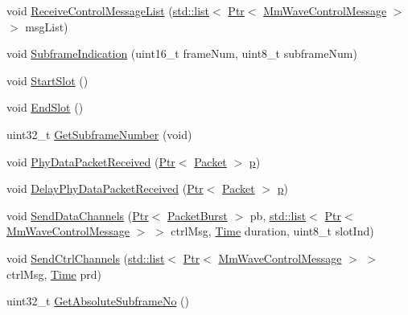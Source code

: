 \begin{DoxyCompactItemize}
void \hyperlink{classns3_1_1MmWaveUePhy_a1c3001d74628f40e38c1b4a04eac5015}{Receive\+Control\+Message\+List} (\hyperlink{openflow-interface_8h_afd9bcfa176617760671b67580f536fa7}{std\+::list}$<$ \hyperlink{classns3_1_1Ptr}{Ptr}$<$ \hyperlink{classns3_1_1MmWaveControlMessage}{Mm\+Wave\+Control\+Message} $>$ $>$ msg\+List)
\item 
void \hyperlink{classns3_1_1MmWaveUePhy_acefe97bdfce414651ec98e37b62d6705}{Subframe\+Indication} (uint16\+\_\+t frame\+Num, uint8\+\_\+t subframe\+Num)
\item 
void \hyperlink{classns3_1_1MmWaveUePhy_a0ba9495d0cc715ff879dead5c1b5ac5e}{Start\+Slot} ()
\item 
void \hyperlink{classns3_1_1MmWaveUePhy_a3ee0c4174ef8632859d232b73cbaad0a}{End\+Slot} ()
\item 
uint32\+\_\+t \hyperlink{classns3_1_1MmWaveUePhy_ad37273feb3204e61c22d825d0a655e66}{Get\+Subframe\+Number} (void)
\item 
void \hyperlink{classns3_1_1MmWaveUePhy_a439193d17fd93b179faa9db76f2b84af}{Phy\+Data\+Packet\+Received} (\hyperlink{classns3_1_1Ptr}{Ptr}$<$ \hyperlink{classns3_1_1Packet}{Packet} $>$ \hyperlink{lte__link__budget__x2__handover__measures_8m_ac9de518908a968428863f829398a4e62}{p})
\item 
void \hyperlink{classns3_1_1MmWaveUePhy_a80b7af8416a090578b814b3487f5af38}{Delay\+Phy\+Data\+Packet\+Received} (\hyperlink{classns3_1_1Ptr}{Ptr}$<$ \hyperlink{classns3_1_1Packet}{Packet} $>$ \hyperlink{lte__link__budget__x2__handover__measures_8m_ac9de518908a968428863f829398a4e62}{p})
\item 
void \hyperlink{classns3_1_1MmWaveUePhy_aa6b0783ace32cbc0e6bbf24e256cce6d}{Send\+Data\+Channels} (\hyperlink{classns3_1_1Ptr}{Ptr}$<$ \hyperlink{classns3_1_1PacketBurst}{Packet\+Burst} $>$ pb, \hyperlink{openflow-interface_8h_afd9bcfa176617760671b67580f536fa7}{std\+::list}$<$ \hyperlink{classns3_1_1Ptr}{Ptr}$<$ \hyperlink{classns3_1_1MmWaveControlMessage}{Mm\+Wave\+Control\+Message} $>$ $>$ ctrl\+Msg, \hyperlink{classns3_1_1Time}{Time} duration, uint8\+\_\+t slot\+Ind)
\item 
void \hyperlink{classns3_1_1MmWaveUePhy_a14158d6bc5c762fdb0841966f9dfa8cf}{Send\+Ctrl\+Channels} (\hyperlink{openflow-interface_8h_afd9bcfa176617760671b67580f536fa7}{std\+::list}$<$ \hyperlink{classns3_1_1Ptr}{Ptr}$<$ \hyperlink{classns3_1_1MmWaveControlMessage}{Mm\+Wave\+Control\+Message} $>$ $>$ ctrl\+Msg, \hyperlink{classns3_1_1Time}{Time} prd)
\item 
uint32\+\_\+t \hyperlink{classns3_1_1MmWaveUePhy_afa86fa3a35a6f06a3f4eb038d0878769}{Get\+Absolute\+Subframe\+No} ()

\end{DoxyCompactItemize}
